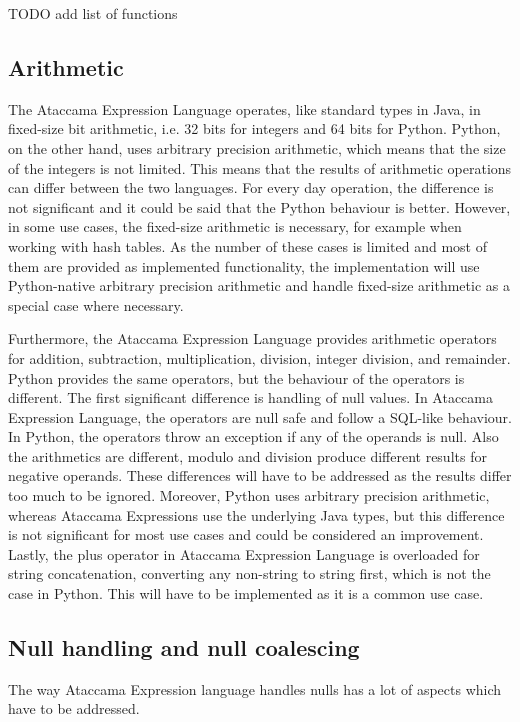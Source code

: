 TODO add list of functions

\subsection{Arithmetic}
The Ataccama Expression Language operates, like standard types in Java, in
fixed-size bit arithmetic, i.e. 32 bits for integers and 64 bits for Python. Python,
on the other hand, uses arbitrary precision arithmetic, which means that the size
of the integers is not limited. This means that the results of arithmetic operations
can differ between the two languages.
For every day operation, the difference is not significant and it could be said
that the Python behaviour is better. However, in some use cases, the fixed-size
arithmetic is necessary, for example when working with hash tables. As the number
of these cases is limited and most of them are provided as implemented functionality,
the implementation will use Python-native arbitrary precision arithmetic and
handle fixed-size arithmetic as a special case where necessary.

Furthermore, the Ataccama Expression Language provides arithmetic operators
for addition, subtraction, multiplication, division, integer division, and remainder. 
Python provides the same operators, but
the behaviour of the operators is different. The first significant difference
is handling of null values. In Ataccama Expression Language, the operators are null safe and
follow a SQL-like behaviour. In Python, the operators throw an exception if any of the operands is null.
Also the arithmetics are different, modulo and division produce different results for negative operands. These differences will have to be addressed as the
results differ too much to be ignored.  Moreover, Python uses arbitrary precision arithmetic, whereas Ataccama Expressions use the underlying Java types, but this difference is not significant for most use cases and could be considered an improvement. 
Lastly, the plus operator in Ataccama Expression Language is overloaded for string concatenation, converting any non-string to string first, which is not the case in Python. This will have to be implemented as it is a common use case.


\subsection{Null handling and null coalescing}

The way Ataccama Expression language handles nulls has a lot of aspects
which have to be addressed.

